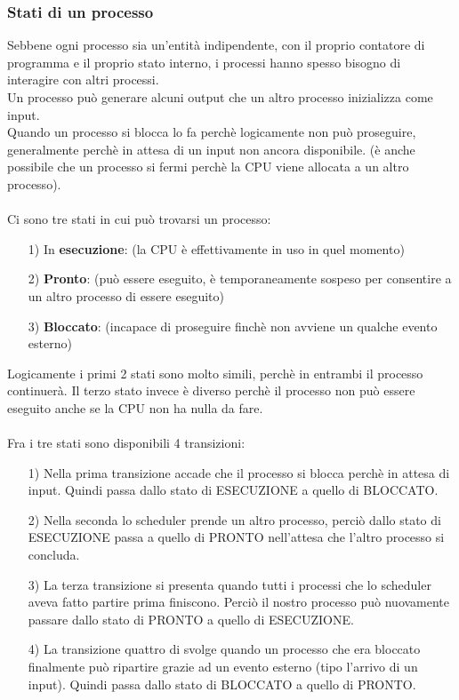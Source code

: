 \documentclass{article}
\begin{document}
\subsubsection{Stati di un processo}
Sebbene ogni processo sia un'entità indipendente, con il proprio contatore di programma e il proprio stato interno, i processi hanno spesso bisogno di interagire con altri processi.
\\
Un processo può generare alcuni output che un altro processo inizializza come input.
\\
Quando un processo si blocca lo fa perchè logicamente non può proseguire, generalmente perchè in attesa di un input non ancora disponibile. (è anche possibile che un processo si fermi perchè la CPU viene allocata a un altro processo).
\\
\\
Ci sono tre stati in cui può trovarsi un processo:
\begin{enumerate}
   \item[1)] In \textbf{esecuzione}: (la CPU è effettivamente in uso in quel momento)
   \item[2)] \textbf{Pronto}: (può essere eseguito, è temporaneamente sospeso per consentire a un altro processo di essere eseguito)
   \item[3)] \textbf{Bloccato}: (incapace di proseguire finchè non avviene un qualche evento esterno)
\end{enumerate}
Logicamente i primi 2 stati sono molto simili, perchè in entrambi il processo continuerà. Il terzo stato invece è diverso perchè il processo non può essere 
eseguito anche se la CPU non ha nulla da fare.
\\
\\
Fra i tre stati sono disponibili 4 transizioni:
\begin{enumerate}
   \item[1)] Nella prima transizione accade che il processo si blocca perchè in attesa di input. Quindi passa dallo stato di ESECUZIONE a quello di BLOCCATO.
   \item[2)] Nella seconda lo scheduler prende un altro processo, perciò dallo stato di ESECUZIONE passa a quello di PRONTO nell'attesa che l'altro processo si concluda.
   \item[3)] La terza transizione si presenta quando tutti i processi che lo scheduler aveva fatto partire prima finiscono. Perciò il nostro processo può nuovamente passare dallo stato di PRONTO a quello di ESECUZIONE.
   \item[4)] La transizione quattro di svolge quando un processo che era bloccato finalmente può ripartire grazie ad un evento esterno (tipo l'arrivo di un input). Quindi passa dallo stato di BLOCCATO a quello di PRONTO.
\end{enumerate}
\end{document}
